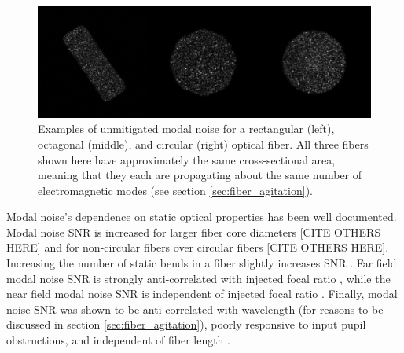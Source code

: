 \documentclass[twocolumn]{emulateapj}
\begin{document}
\begin{figure}
\centering
	\includegraphics[width=\columnwidth]{images/fiber_example.png}
	\caption{Examples of unmitigated modal noise for a rectangular (left), octagonal (middle), and circular (right) optical fiber. All three fibers shown here have approximately the same cross-sectional area, meaning that they each are propagating about the same number of electromagnetic modes (see section \ref{sec:fiber_agitation}).}
\label{fig:fiber_example}
\end{figure}

Modal noise's dependence on static optical properties has been well documented. Modal noise SNR is increased for larger fiber core diameters \citep{Sablowski2015} [CITE OTHERS HERE] and for non-circular fibers over circular fibers \citep{Sturmer2016, Sablowski2015} [CITE OTHERS HERE]. Increasing the number of static bends in a fiber slightly increases SNR \citep{Imai1979}. Far field modal noise SNR is strongly anti-correlated with injected focal ratio \citep{Sablowski2015}, while the near field modal noise SNR is independent of injected focal ratio \citep{Baudrand2001}. Finally, modal noise SNR was shown to be anti-correlated with wavelength (for reasons to be discussed in section \ref{sec:fiber_agitation}), poorly responsive to input pupil obstructions, and independent of fiber length \citep{Baudrand2001}.
\end{document}
